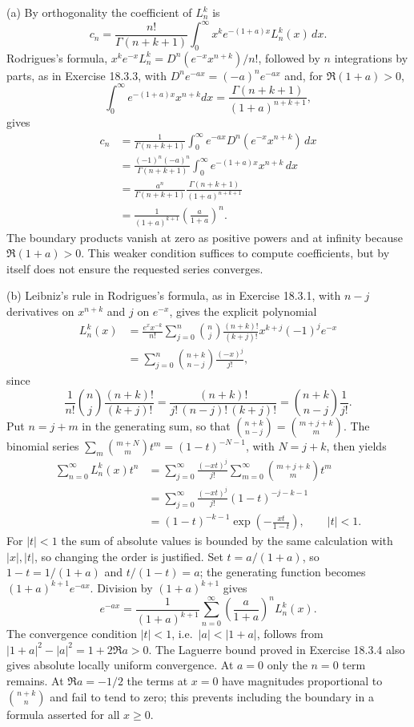 (a) By orthogonality the coefficient of $L_n^k$ is
\[
c_n=\frac{n!}{\Gamma(n+k+1)}
 \int_0^\infty x^ke^{-(1+a)x}L_n^k(x)\,dx.
\]
Rodrigues's formula, $x^ke^{-x}L_n^k=D^n(e^{-x}x^{n+k})/n!$, followed by
$n$ integrations by parts, as in Exercise 18.3.3, with
$D^ne^{-ax}=(-a)^ne^{-ax}$ and, for $\Re(1+a)>0$,
\[
\int_0^\infty e^{-(1+a)x}x^{n+k}dx=\frac{\Gamma(n+k+1)}{(1+a)^{n+k+1}},
\]
gives
\begin{align*}
c_n
 &=\frac1{\Gamma(n+k+1)}\int_0^\infty
       e^{-ax}D^n(e^{-x}x^{n+k})\,dx\\
 &=\frac{(-1)^n(-a)^n}{\Gamma(n+k+1)}
       \int_0^\infty e^{-(1+a)x}x^{n+k}\,dx\\
 &=\frac{a^n}{\Gamma(n+k+1)}
       \frac{\Gamma(n+k+1)}{(1+a)^{n+k+1}}\\
 &=\frac1{(1+a)^{k+1}}\left(\frac a{1+a}\right)^n.
\end{align*}
The boundary products vanish at zero as positive powers and at
infinity because $\Re(1+a)>0$.  This weaker condition suffices to
compute coefficients, but by itself does not ensure the requested
series converges.

(b) Leibniz's rule in Rodrigues's formula, as in Exercise 18.3.1, with
$n-j$ derivatives on $x^{n+k}$ and $j$ on $e^{-x}$, gives the explicit
polynomial
\begin{align*}
L_n^k(x)
 &=\frac{e^xx^{-k}}{n!}\sum_{j=0}^n\binom nj
   \frac{(n+k)!}{(k+j)!}x^{k+j}(-1)^je^{-x}\\
 &=\sum_{j=0}^n\binom{n+k}{n-j}\frac{(-x)^j}{j!},
\end{align*}
since
\[
\frac1{n!}\binom nj\frac{(n+k)!}{(k+j)!}
=\frac{(n+k)!}{j!\,(n-j)!\,(k+j)!}=\binom{n+k}{n-j}\frac1{j!}.
\]
Put $n=j+m$ in the generating sum, so that
$\binom{n+k}{n-j}=\binom{m+j+k}{m}$.  The binomial series
$\sum_m\binom{m+N}{m}t^m=(1-t)^{-N-1}$, with $N=j+k$, then yields
\begin{align*}
\sum_{n=0}^\infty L_n^k(x)t^n
 &=\sum_{j=0}^\infty\frac{(-xt)^j}{j!}
      \sum_{m=0}^\infty\binom{m+j+k}{m}t^m\\
 &=\sum_{j=0}^\infty\frac{(-xt)^j}{j!}(1-t)^{-j-k-1}\\
 &=(1-t)^{-k-1}\exp\!\left(-\frac{xt}{1-t}\right),
 \qquad |t|<1.
\end{align*}
For $|t|<1$ the sum of absolute values is bounded by the same
calculation with $|x|,|t|$, so changing the order is justified.
Set $t=a/(1+a)$, so $1-t=1/(1+a)$ and $t/(1-t)=a$; the generating
function becomes $(1+a)^{k+1}e^{-ax}$.  Division by $(1+a)^{k+1}$ gives
\[
\boxed{e^{-ax}=\frac1{(1+a)^{k+1}}
 \sum_{n=0}^\infty\left(\frac a{1+a}\right)^nL_n^k(x)}.
\]
The convergence condition $|t|<1$, i.e.\ $|a|<|1+a|$, follows from
$|1+a|^2-|a|^2=1+2\Re a>0$.  The Laguerre bound proved in
Exercise 18.3.4 also gives absolute locally uniform convergence.
At $a=0$ only the $n=0$ term remains.  At $\Re a=-1/2$ the
terms at $x=0$ have magnitudes proportional to
$\binom{n+k}{n}$ and fail to tend to zero; this prevents including
the boundary in a formula asserted for all $x\ge0$.

